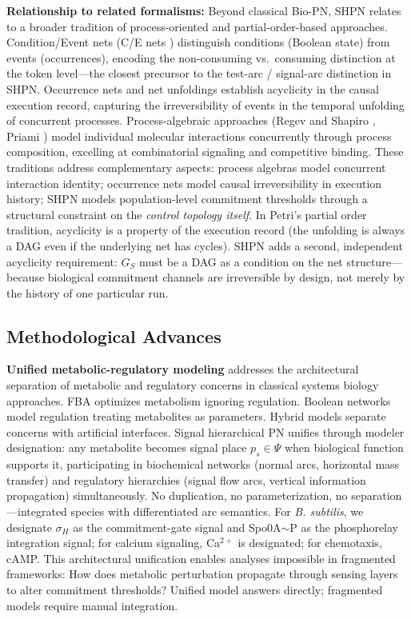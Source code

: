 \documentclass[10pt,letterpaper]{article}
\begin{document}
\textbf{Relationship to related formalisms:} Beyond classical Bio-PN, SHPN relates to a broader tradition of process-oriented and partial-order-based approaches. Condition/Event nets (C/E nets \cite{rozenberg1998}) distinguish conditions (Boolean state) from events (occurrences), encoding the non-consuming vs.~consuming distinction at the token level---the closest precursor to the test-arc / signal-arc distinction in SHPN. Occurrence nets and net unfoldings \cite{nielsen1981,winskel1987} establish acyclicity in the causal execution record, capturing the irreversibility of events in the temporal unfolding of concurrent processes. Process-algebraic approaches (Regev and Shapiro \cite{regev2002}, Priami \cite{priami2005}) model individual molecular interactions concurrently through process composition, excelling at combinatorial signaling and competitive binding. These traditions address complementary aspects: process algebras model concurrent interaction identity; occurrence nets model causal irreversibility in execution history; SHPN models population-level commitment thresholds through a structural constraint on the \textit{control topology itself}. In Petri's partial order tradition, acyclicity is a property of the execution record (the unfolding is always a DAG even if the underlying net has cycles). SHPN adds a second, independent acyclicity requirement: $G_S$ must be a DAG as a condition on the net structure---because biological commitment channels are irreversible by design, not merely by the history of one particular run.

\subsection{Methodological Advances}

\textbf{Unified metabolic-regulatory modeling} addresses the architectural separation of metabolic and regulatory concerns in classical systems biology approaches. FBA optimizes metabolism ignoring regulation. Boolean networks model regulation treating metabolites as parameters. Hybrid models separate concerns with artificial interfaces. Signal hierarchical PN unifies through modeler designation: any metabolite becomes signal place $p_s \in \Psi$ when biological function supports it, participating in biochemical networks (normal arcs, horizontal mass transfer) and regulatory hierarchies (signal flow arcs, vertical information propagation) simultaneously. No duplication, no parameterization, no separation---integrated species with differentiated arc semantics. For \textit{B. subtilis}, we designate $\sigma_H$ as the commitment-gate signal and Spo0A$\sim$P as the phosphorelay integration signal; for calcium signaling, Ca$^{2+}$ is designated; for chemotaxis, cAMP. This architectural unification enables analyses impossible in fragmented frameworks: How does metabolic perturbation propagate through sensing layers to alter commitment thresholds? Unified model answers directly; fragmented models require manual integration.
\end{document}
